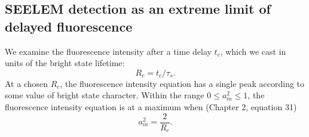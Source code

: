\documentclass[12pt]{mitthesis}
\begin{document}


\subsection*{SEELEM detection as an extreme limit of delayed fluorescence}

We examine the fluorescence intensity after a time delay $t_c$,
which we cast in units of the bright state lifetime:
\begin{equation}
  R_c = t_c / \tau_s.
\end{equation}
At a chosen $R_c$, the fluorescence intensity equation has a single
peak according to some value of bright state character.  Within the
range $0 \le a_m^2 \le 1$, the fluorescence intensity equation is at a
maximum when (Chapter 2, equation 31)
\begin{equation}
  \label{eq:am-max}
  a_m^2 = \frac{2}{R_c}.
\end{equation}
\end{document}
